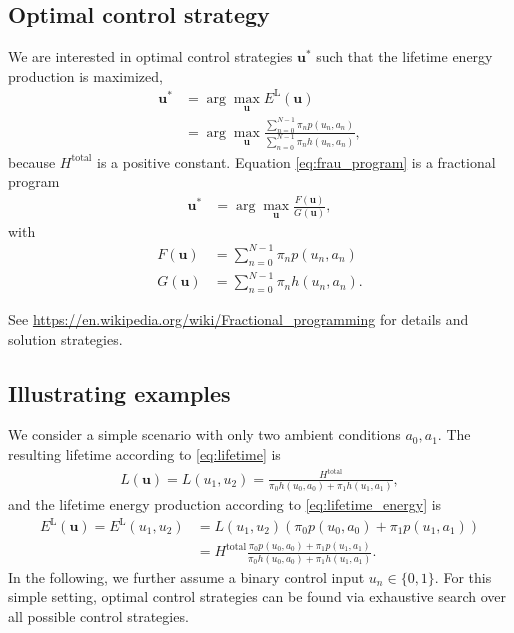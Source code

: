 \documentclass{article}
\begin{document}
    \subsection{Optimal control strategy}
    We are interested in optimal control strategies $\boldsymbol{u}^*$ such that the lifetime energy production is maximized,
    \begin{align}
        \boldsymbol{u}^* &= \arg \max_{\boldsymbol{u}} E^\text{L}(\boldsymbol{u})\\
        &= \arg \max_{\boldsymbol{u}} \frac{\sum_{n = 0}^{N - 1} \pi_n p(u_n, a_n)}{\sum_{n = 0}^{N - 1} \pi_n h(u_n, a_n)},\label{eq:frau_program}
    \end{align}
    because $H^\text{total}$ is a positive constant. Equation \eqref{eq:frau_program} is a fractional program
    \begin{align}
        \boldsymbol{u}^* &= \arg \max_{\boldsymbol{u}} \frac{F(\boldsymbol{u})}{G(\boldsymbol{u})},
    \end{align}
    with
    \begin{align}
        F(\boldsymbol{u}) &= \sum_{n = 0}^{N - 1} \pi_n p(u_n, a_n)\\
        G(\boldsymbol{u}) &= \sum_{n = 0}^{N - 1} \pi_n h(u_n, a_n).
    \end{align}

    See \url{https://en.wikipedia.org/wiki/Fractional_programming} for de\-tails and solution strategies.

    \subsection{Illustrating examples}
    We consider a simple scenario with only two ambient conditions $a_0, a_1$. The resulting lifetime according to \eqref{eq:lifetime} is
    \begin{align}
        L(\boldsymbol{u}) = L(u_1, u_2) = \frac{H^\text{total}}{\pi_0 h(u_0, a_0) + \pi_1 h(u_1, a_1)},
    \end{align}
    and the lifetime energy production according to \eqref{eq:lifetime_energy} is
    \begin{align}
        E^\text{L}(\boldsymbol{u}) = E^\text{L}(u_1, u_2) &= L(u_1, u_2) \left(\pi_0 p(u_0, a_0) + \pi_1 p(u_1, a_1)\right)\\
        &= H^\text{total} \frac{\pi_0 p(u_0, a_0) + \pi_1 p(u_1, a_1)}{\pi_0 h(u_0, a_0) + \pi_1 h(u_1, a_1)}.
    \end{align}
    In the following, we further assume a binary control input $u_n \in \{0, 1\}$. For this simple setting, optimal control strategies can be found via exhaustive search over all possible control strategies.
    
\end{document}
